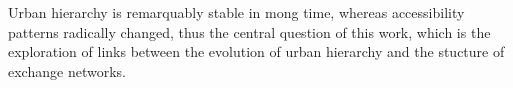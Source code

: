 Urban hierarchy is remarquably stable in mong time, whereas accessibility patterns radically changed, thus the central question of this work, which is the exploration of links between the evolution of urban hierarchy and the stucture of exchange networks.













